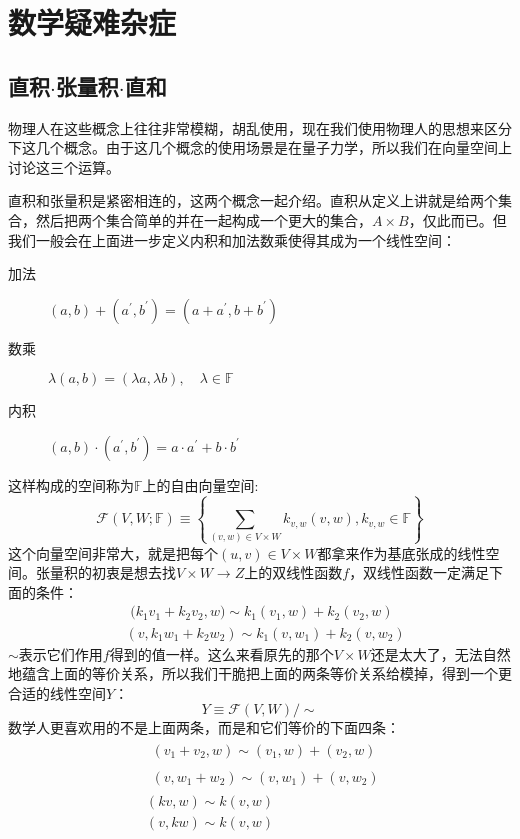 \chapter{数学疑难杂症}
\section{直积$\cdot$张量积$\cdot$直和}
物理人在这些概念上往往非常模糊，胡乱使用，现在我们使用物理人的思想来区分下这几个概念。由于这几个概念的使用场景是在量子力学，所以我们在向量空间上讨论这三个运算。

直积和张量积是紧密相连的，这两个概念一起介绍。直积从定义上讲就是给两个集合，然后把两个集合简单的并在一起构成一个更大的集合，$A\times B$，仅此而已。但我们一般会在上面进一步定义内积和加法数乘使得其成为一个线性空间：
\begin{description}
	\item[加法] $(a,b)+(a^\prime,b^\prime)=(a+a^\prime,b+b^\prime)$
	\item[数乘] $\lambda (a,b)=(\lambda a,\lambda b),\quad\lambda\in\mathbb{F}$
	\item[内积] $(a,b)\cdot (a^\prime,b^\prime)= a\cdot a^\prime +b\cdot b^\prime$
\end{description}
这样构成的空间称为$\mathbb{F}$上的自由向量空间:
\begin{equation}
	\mathcal{F}(V,W;\mathbb{F})\equiv \left\{\sum_{(v,w)\in V\times W}k_{v,w}(v,w),k_{v,w}\in\mathbb{F}\right\}
\end{equation}
这个向量空间非常大，就是把每个$(u,v)\in V\times W$都拿来作为基底张成的线性空间。张量积的初衷是想去找$V\times W\to Z$上的双线性函数$f$，双线性函数一定满足下面的条件：
\begin{equation}
	\begin{aligned}&\text{ (}k_1v_1+k_2v_2,w)\sim k_1(v_1,w)+k_2(v_2,w)\\&(v,k_1w_1+k_2w_2)\sim k_1(v,w_1)+k_2(v,w_2)\end{aligned}
\end{equation}
$\sim$表示它们作用$f$得到的值一样。这么来看原先的那个$V\times W$还是太大了，无法自然地蕴含上面的等价关系，所以我们干脆把上面的两条等价关系给模掉，得到一个更合适的线性空间$Y$：
\begin{equation}
	Y\equiv \mathcal{F}(V,W)/\sim
\end{equation}
数学人更喜欢用的不是上面两条，而是和它们等价的下面四条：
\begin{equation}
	\begin{aligned}
		&\begin{aligned}(v_1+v_2,w)\sim(v_1,w)+(v_2,w)\end{aligned} \\
		&\begin{aligned}(v,w_1+w_2)\sim(v,w_1)+(v,w_2)\end{aligned} \\
		&(kv,w)\sim k(v,w) \\
		&(v,kw)\sim k(v,w)
	\end{aligned}
\end{equation}


